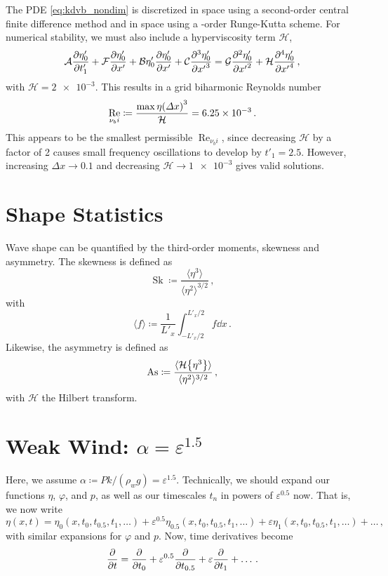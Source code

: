 \documentclass{jfm}
\let\Oldsection\section
\renewcommand{\section}{\FloatBarrier\Oldsection}
\DeclareMathOperator{\Sk}{Sk}
\DeclareMathOperator{\As}{As}
\DeclareMathOperator{\Reyn}{Re}
\newcommand{\hilbert}{\mathcal{H}}
\renewcommand*{\epsilon}{\varepsilon}
\begin{document}
The PDE \cref{eq:kdvb_nondim} is discretized in space using a
second-order central finite difference method and in space using a
-order Runge-Kutta scheme.
For numerical stability, we must also include a hyperviscosity term
$\mathcal{H}$,
\begin{equation}
  \mathcal{A} \pdv{\eta'_0}{t'_1} + \mathcal{F} \pdv{\eta'_0}{x'} + \mathcal{B}
  \eta'_0 \pdv{\eta'_0}{x'} + \mathcal{C} \pdv[3]{\eta'_0}{{x'}} =
  \mathcal{G} \pdv[2]{\eta'_0}{{x'}} + \mathcal{H}
  \pdv[4]{\eta'_0}{{x'}} \,,
\end{equation}
with $\mathcal{H} = \num{2e-3}$.
This results in a grid biharmonic Reynolds number
\begin{equation}
  \Reyn_{\nu_bi} \coloneqq \frac{\max{\eta} \pqty{\Delta
  x}^3}{\mathcal{H}} = \num{6.25e-3} \,.
\end{equation}
This appears to be the smallest permissible $\Reyn_{\nu_bi}$, since
decreasing $\mathcal{H}$ by a factor of 2 causes small frequency
oscillations to develop by $t'_1=2.5$.
However, increasing $\Delta x \to 0.1$ and decreasing $\mathcal{H} \to
\num{1e-3}$ gives valid solutions.

\section{Shape Statistics}
Wave shape can be quantified by the third-order moments, skewness and
asymmetry.
The skewness is defined as
\begin{equation}
  \Sk \coloneqq \frac{\langle \eta^3 \rangle}{\langle \eta^2
  \rangle^{3/2}} \,,
\end{equation}
with
\begin{equation}
  \langle f \rangle \coloneqq \frac{1}{L'_x} \int_{-L'_x/2}^{L'_x/2} f
  \dd{x} \,.
\end{equation}
Likewise, the asymmetry is defined as
\begin{equation}
  \As \coloneqq \frac{\langle \hilbert \Bqty{\eta^3} \rangle}{\langle
    \eta^2 \rangle^{3/2}} \,,
\end{equation}
with $\hilbert$ the Hilbert transform.

\section{\texorpdfstring{Weak Wind: $\alpha = \epsilon^{1.5}$}{Weak
Wind} \label{sec:weak}}
Here, we assume $\alpha \coloneqq P k/(\rho_w g) = \epsilon^{1.5}$.
Technically, we should expand our functions $\eta$, $\varphi$, and $p$,
as well as our timescales $t_n$ in powers of $\epsilon^{0.5}$ now.
That is, we now write
\begin{equation}
  \eta(x,t) = \eta_0(x,t_0,t_{0.5},t_1,\ldots) + \epsilon^{0.5}
  \eta_{0.5}(x,t_0,t_{0.5},t_1,\ldots) + \epsilon
  \eta_1(x,t_0,t_{0.5},t_1,\ldots) + \ldots \,,
\end{equation}
with similar expansions for $\varphi$ and $p$.
Now, time derivatives become
\begin{equation}
  \pdv{t} = \pdv{t_0} + \epsilon^{0.5} \pdv{t_{0.5}} + \epsilon
  \pdv{t_1} + \ldots \,.
\end{equation}
\end{document}
